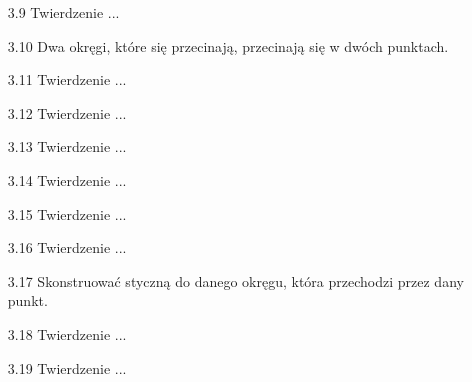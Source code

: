 \begin{enumerate}
    \item [3.9] Twierdzenie ...
    \item [3.10] Dwa okręgi, które się przecinają, przecinają się w dwóch punktach. 
    \item [3.11] Twierdzenie ...
    \item [3.12] Twierdzenie ...
    \item [3.13] Twierdzenie ...
    \item [3.14] Twierdzenie ...
    \item [3.15] Twierdzenie ...
    \item [3.16] Twierdzenie ... 
    \item [3.17] Skonstruować styczną do danego okręgu, która przechodzi przez dany punkt.
    \item [3.18] Twierdzenie ...
    \item [3.19] Twierdzenie ...

\end{enumerate}
